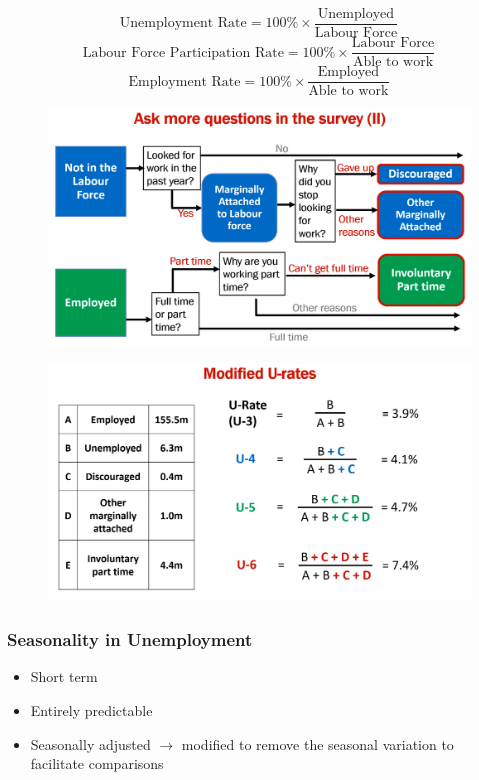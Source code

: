 \documentclass{article}
\begin{document}
\begin{multicols}{2}
\begin{equation*}
	\text{Unemployment Rate} = 100\% \times \frac{\text{Unemployed}}{\text{Labour Force}}
\end{equation*}
\begin{equation*}
	\text{Labour Force Participation Rate} = 100\% \times \frac{\text{Labour Force}}{\text{Able to work}}
\end{equation*}
\begin{equation*}
	\text{Employment Rate} = 100\% \times \frac{\text{Employed}}{\text{Able to work}}
\end{equation*}
\begin{figure}[H]
	\centering
	\includegraphics[width=\columnwidth]{images/unemployment2.png}
\end{figure}
\begin{figure}[H]
	\centering
	\includegraphics[width=\columnwidth]{images/unemployment3.png}
\end{figure}




\subsubsection{Seasonality in Unemployment}
\begin{itemize}
	\item Short term
	\item Entirely predictable
	\item Seasonally adjusted $\rightarrow$ modified to remove the seasonal variation to facilitate comparisons
\end{itemize}

\end{multicols}
\end{document}
